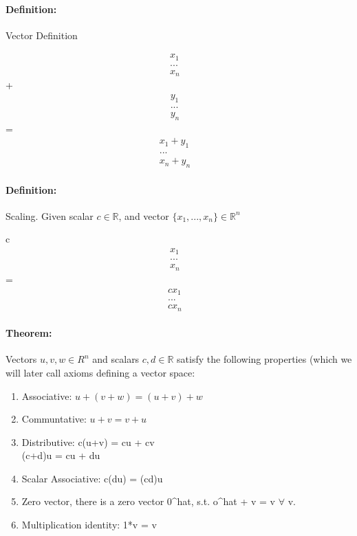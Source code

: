 \documentclass[11pt]{report}
\newcommand{\R}{\mathbb{R}}
\newenvironment{theorem}{\paragraph{Theorem:}}{\hfill}
\newenvironment{definition}{\paragraph{Definition:}}{\hfill}
\begin{document}
\begin{definition} Vector Definition

\[\begin{matrix}{}
  x_1& \\
  ...& \\
  x_n&
\end{matrix}\]
 + \[\begin{matrix}{}
  y_1& \\
  ...& \\
  y_n&
\end{matrix}\]
 = \[\begin{matrix}{}
  x_1 + y_1& \\
  ...& \\
  x_n + y_n &
\end{matrix}\]


	
\end{definition}

\begin{definition} Scaling. Given scalar $c \in \R$, and vector $\{x_1, ..., x_n\} \in \R^n$

c \[\begin{matrix}{}
  x_1 & \\
  ...&\\
  x_n&
\end{matrix}\]
 =\[\begin{matrix}{}
  cx_1 & \\
  ...&\\
  cx_n&
\end{matrix}\]	
\end{definition}


\begin{theorem}
	Vectors $u,v,w \in R^n$ and scalars $c,d \in \R$ satisfy the following properties (which we will later call axioms defining a vector space:
	\begin{enumerate}
		\item Associative: $u + (v+w) = (u+v) + w $
		\item Communtative: $u + v = v+u $
		\item Distributive: c(u+v) = cu + cv \\  (c+d)u = cu + du
		\item Scalar Associative: c(du) = (cd)u
		\item Zero vector, there is a zero vector 0^hat, s.t. o^hat + v = v $\forall$ v.
		\item Multiplication identity: 1*v = v
	\end{enumerate}
\end{theorem}
\end{document}
